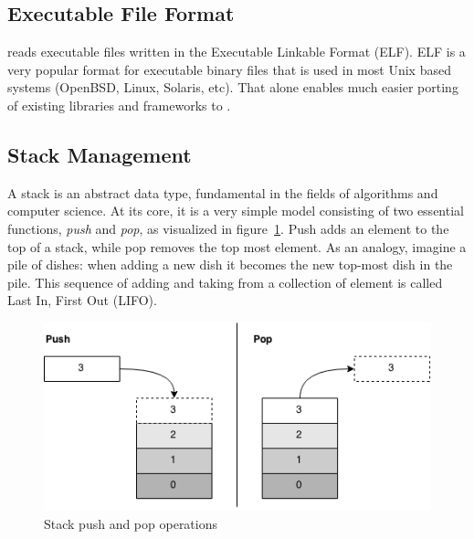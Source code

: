 
\subsection{Executable File Format}
\thename{} reads executable files written in the Executable Linkable Format
(ELF). ELF is a very popular format for executable binary files that is used in
most Unix based systems (OpenBSD, Linux, Solaris, etc\cite{NEEDED}). That alone
enables much easier porting of existing libraries and frameworks to
\thename{}.

\subsection{Stack Management}
\label{sec:design:stack-mgmt}

A stack is an abstract data type, fundamental in the fields of algorithms and
computer science. At its core, it is a very simple model consisting of two
essential functions, {\it push} and {\it pop}, as visualized in
figure~\ref{fig:stack}. Push adds an element to the top of a stack, while pop
removes the top most element. As an analogy, imagine a pile of dishes: when
adding a new dish it becomes the new top-most dish in the pile. This sequence of
adding and taking from a collection of element is called Last In, First Out
(LIFO).
\begin{figure}[h]
  \centering
  \includegraphics[scale=0.6]{images/stack.png}
  \caption{Stack push and pop operations}
  \label{fig:stack}
\end{figure}


